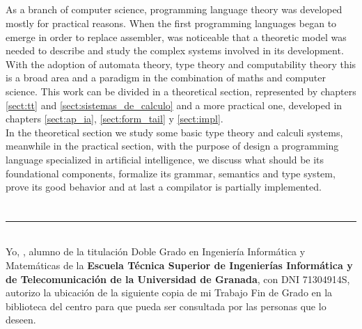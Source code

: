 \begin{center}
{\large\bfseries \myOfficialTitleEng}\\
\end{center}
\begin{center}
\myName\\
\end{center}

\\

\vspace{0.7cm}
\\

As a branch of computer science, programming language theory was developed mostly for practical reasons. When the first programming languages began to emerge in order to replace assembler, was noticeable that a theoretic model was needed to describe and study the complex systems involved in its development. With the adoption of automata theory, type theory and computability theory this is a broad area and a paradigm in the combination of maths and computer science. This work can be divided in a theoretical section, represented by chapters \ref{sect:tt} and \ref{sect:sistemas_de_calculo} and a more practical one, developed in chapters \ref{sect:ap_ia}, \ref{sect:form_tail} y \ref{sect:impl}.\\

In the theoretical section we study some basic type theory and calculi systems, meanwhile in the practical section, with the purpose of design a programming language specialized in artificial intelligence, we discuss what should be its foundational components, formalize its grammar, semantics and type system, prove its good behavior and at last a compilator is partially implemented.\\

\chapter*{}
\thispagestyle{empty}

\noindent\rule[-1ex]{\textwidth}{2pt}\\[4.5ex]

Yo, \textbf{\myName}, alumno de la titulación Doble Grado en Ingeniería Informática y Matemáticas de la \textbf{Escuela Técnica Superior
de Ingenierías Informática y de Telecomunicación de la Universidad de Granada}, con DNI 71304914S, autorizo la
ubicación de la siguiente copia de mi Trabajo Fin de Grado en la biblioteca del centro para que pueda ser
consultada por las personas que lo deseen.


